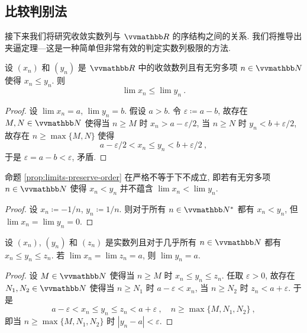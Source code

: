 \subsection{比较判别法}

接下来我们将研究收敛实数列与 \(\R\) 的序结构之间的关系. 我们将推导出夹逼定理---这是一种简单但非常有效的判定实数列极限的方法.

\begin{proposition}[保序性]\label{prop:limits-preserve-order}
    设 \((x_n)\) 和 \((y_n)\) 是 \(\R\) 中的收敛数列且有无穷多项 \(n \in \N\) 使得 \(x_n \leq y_n\). 则
    \[
        \lim x_n \leq \lim y_n\ .
    \]
\end{proposition}

\begin{proof}
    设 \(\lim x_n = a\), \(\lim y_n = b\). 假设 \(a > b\). 令 \(\varepsilon \coloneqq a - b\), 故存在 \(M, N \in \N\) 使得当 \(n \geq M\) 时 \(x_n > a - \varepsilon / 2\), 当 \(n \geq N\) 时 \(y_n < b + \varepsilon / 2\), 故存在 \(n \geq \max\{M, N\}\) 使得
    \[
        a - \varepsilon / 2 < x_n \leq y_n < b + \varepsilon / 2\ ,
    \]
    于是 \(\varepsilon = a - b < \varepsilon\), 矛盾.
\end{proof}

\begin{remark}
    命题 \ref{prop:limits-preserve-order} 在严格不等于下不成立, 即若有无穷多项 \(n \in \N\) 使得 \(x_n < y_n\) 并不蕴含 \(\lim x_n < \lim y_n\).
\end{remark}

\begin{proof}
    设 \(x_n \coloneqq - 1 / n\), \(y_n \coloneqq 1 / n\). 则对于所有 \(n \in \N^\ast\) 都有 \(x_n < y_n\), 但 \(\lim x_n = \lim y_n = 0\).
\end{proof}

\begin{proposition}[夹逼定理]
    设 \((x_n)\), \((y_n)\) 和 \((z_n)\) 是实数列且对于几乎所有 \(n \in \N\) 都有 \(x_n \leq y_n \leq z_n\). 若 \(\lim x_n = \lim z_n = a\), 则 \(\lim y_n = a\).
\end{proposition}

\begin{proof}
    设 \(M \in \N\) 使得当 \(n \geq M\) 时 \(x_n \leq y_n \leq z_n\). 任取 \(\varepsilon > 0\), 故存在 \(N_1, N_2 \in \N\) 使得当 \(n \geq N_1\) 时 \(a - \varepsilon < x_n\), 当 \(n \geq N_2\) 时 \(z_n < a + \varepsilon\). 于是
    \[
        a - \varepsilon < x_n \leq y_n \leq z_n < a + \varepsilon\ ,\quad n \geq \max\{M, N_1, N_2\}\ ,
    \]
    即当 \(n \geq \max\{M, N_1, N_2\}\) 时 \(|y_n - a| < \varepsilon\).
\end{proof}

